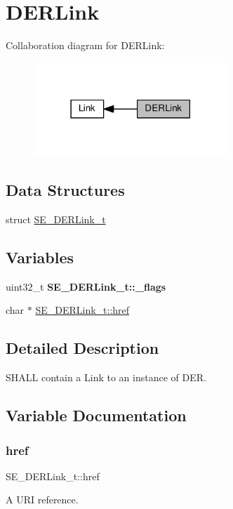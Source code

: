 \hypertarget{group__DERLink}{}\section{D\+E\+R\+Link}
\label{group__DERLink}
Collaboration diagram for D\+E\+R\+Link\+:\nopagebreak
\begin{figure}[H]
\begin{center}
\leavevmode
\includegraphics[width=207pt]{group__DERLink}
\end{center}
\end{figure}
\subsection*{Data Structures}
\begin{DoxyCompactItemize}
\item 
struct \hyperlink{structSE__DERLink__t}{S\+E\+\_\+\+D\+E\+R\+Link\+\_\+t}
\end{DoxyCompactItemize}
\subsection*{Variables}
\begin{DoxyCompactItemize}
\item 
\mbox{\label{group__DERLink_ga32c43a3a5f28ebeb98bbe65d2633609c}} 
uint32\+\_\+t {\bfseries S\+E\+\_\+\+D\+E\+R\+Link\+\_\+t\+::\+\_\+flags}
\item 
char $\ast$ \hyperlink{group__DERLink_gafda2446a3257c158dde0443df06f744a}{S\+E\+\_\+\+D\+E\+R\+Link\+\_\+t\+::href}
\end{DoxyCompactItemize}


\subsection{Detailed Description}
S\+H\+A\+LL contain a Link to an instance of D\+ER. 

\subsection{Variable Documentation}
\mbox{\label{group__DERLink_gafda2446a3257c158dde0443df06f744a}} 
\subsubsection{\texorpdfstring{href}{href}}
{\footnotesize\ttfamily S\+E\+\_\+\+D\+E\+R\+Link\+\_\+t\+::href}

A U\+RI reference. 